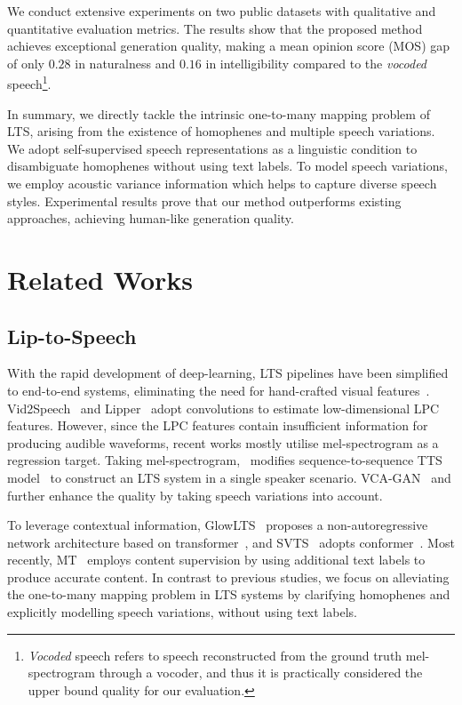 \documentclass[letterpaper]{article} %
\begin{document}
We conduct extensive experiments on two public datasets with qualitative and quantitative evaluation metrics. The results show that the proposed method achieves exceptional generation quality, making a mean opinion score (MOS) gap of only $\mathbf{0.28}$ in naturalness and $\mathbf{0.16}$ in intelligibility compared to the \textit{vocoded} speech\footnote{\textit{Vocoded} speech refers to speech reconstructed from the ground truth mel-spectrogram through a vocoder, and thus it is practically considered the upper bound quality for our evaluation.}.

In summary, we directly tackle the intrinsic one-to-many mapping problem of LTS, arising from the existence of homophenes and multiple speech variations.
We adopt self-supervised speech representations as a linguistic condition to disambiguate homophenes without using text labels.
To model speech variations, we employ acoustic variance information which helps to capture diverse speech styles.
Experimental results prove that our method outperforms existing approaches, achieving human-like generation quality.


\section{Related Works}

\subsection{Lip-to-Speech}
With the rapid development of deep-learning, LTS pipelines have been simplified to end-to-end systems, eliminating the need for hand-crafted visual features~\cite{le2015reconstructing,le2017generating}. Vid2Speech~\cite{ephrat2017vid2speech} and Lipper~\cite{kumar2019lipper} adopt convolutions to estimate low-dimensional LPC features. However, since the LPC features contain insufficient information for producing audible waveforms, recent works mostly utilise mel-spectrogram as a regression target. Taking mel-spectrogram,~\cite{prajwal2020learning} modifies sequence-to-sequence TTS model~\cite{shen2018natural} to construct an LTS system in a single speaker scenario. VCA-GAN~\cite{kim2021lip} and \cite{yadav2021speech} further enhance the quality by taking speech variations into account.

To leverage contextual information, GlowLTS~\cite{he2022flow} proposes a non-autoregressive network architecture based on transformer~\cite{vaswani2017attention}, and SVTS~\cite{mira2022svts} adopts conformer~\cite{gulati2020conformer}.
Most recently, MT~\cite{kim2023lip} employs content supervision by using additional text labels to produce accurate content.
In contrast to previous studies, we focus on alleviating the one-to-many mapping problem in LTS systems by clarifying homophenes and explicitly modelling speech variations, without using text labels.
\end{document}
